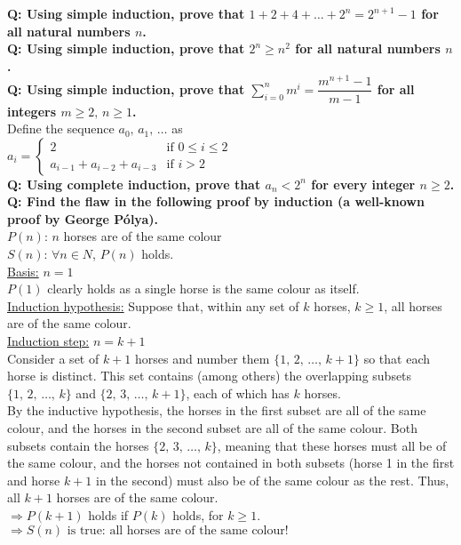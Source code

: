 \documentclass{article}
\begin{document}
{\bf Q: Using simple induction, prove that $1+2+4+\ldots+2^n=2^{n+1}-1$ for all natural numbers $n$.}\\[1em]
{\bf Q: Using simple induction, prove that $2^n\geq n^2$ for all natural numbers $n$.}\\[1em]
{\bf Q: Using simple induction, prove that $\sum\limits_{i=0}^n m^i=\dfrac{m^{n+1}-1}{m-1}$ for all integers $m\geq 2,\,n\geq 1$.}\\[1em]
Define the sequence $a_0,\,a_1,\,\ldots$ as\\
$a_i=\begin{cases}
2&\text{if }0\leq i\leq 2\\
a_{i-1}+a_{i-2}+a_{i-3}&\text{if }i>2
\end{cases}$\\[1ex]
{\bf Q: Using complete induction, prove that $a_n<2^n$ for every integer $n\geq 2$.}\\[1em]
{\bf Q: Find the flaw in the following proof by induction (a well-known proof by George P\'{o}lya).}\\[1ex]
$P(n)$: $n$ horses are of the same colour\\[1ex]
$S(n)$: $\forall n \in N$, $P(n)$ holds.\\[1ex]
\underline{Basis:} $n=1$\\[1ex]
$P(1)$ clearly holds as a single horse is the same colour as itself.\\[1ex]
\underline{Induction hypothesis:} Suppose that, within any set of $k$ horses, $k\geq 1$, all horses are of the same colour.\\[1ex]
\underline{Induction step:} $n=k+1$\\[1ex]
Consider a set of $k+1$ horses and number them $\{1,\,2,\,\ldots,\,k+1\}$ so that each horse is distinct. This set contains (among others) the overlapping subsets $\{1,\,2,\,\ldots,\,k\}$ and $\{2,\,3,\,\ldots,\,k+1\}$, each of which has $k$ horses.\\[1ex]
By the inductive hypothesis, the horses in the first subset are all of the same colour, and the horses in the second subset are all of the same colour. Both subsets contain the horses $\{2,\,3,\,\ldots,\,k\}$, meaning that these horses must all be of the same colour, and the horses not contained in both subsets (horse 1 in the first and horse $k+1$ in the second) must also be of the same colour as the rest. Thus, all $k+1$ horses are of the same colour.\\[1ex]
$\Rightarrow P(k+1)$ holds if $P(k)$ holds, for $k\geq 1$.\\[1ex]
$\boxed{\Rightarrow S(n)\text{ is true: all horses are of the same colour!}}$\\[1em]
\end{document}
